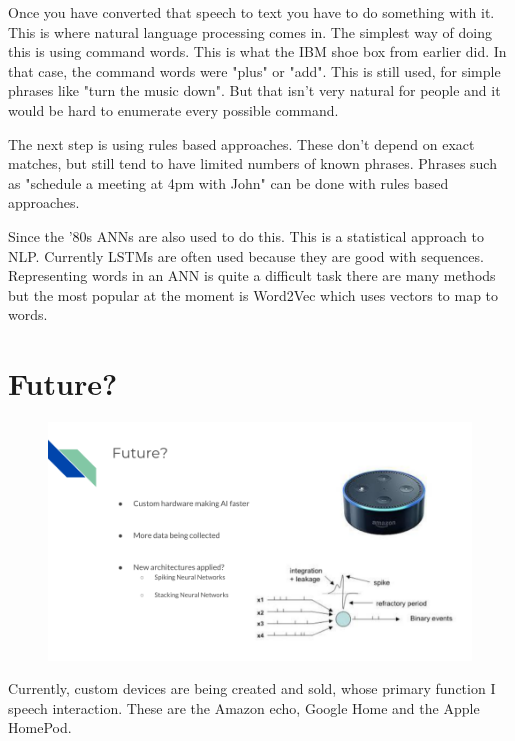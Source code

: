 \documentclass[10pt]{article}
\begin{document}
         Once you have converted that speech to text you have to do something with it. This is where natural language processing comes in.
        The simplest way of doing this is using command words. This is what the IBM shoe box from earlier did. In that case, the command words were "plus" or "add". 
        This is still used, for simple phrases like "turn the music down". But that isn't very natural for people and it would be hard to enumerate every possible command.
        
        The next step is using rules based approaches. These don't depend on exact matches, but still tend to have limited numbers of known phrases. Phrases such as "schedule a meeting at 4pm with John" can be done with rules based approaches. \cite{nlp}
        
        Since the '80s ANNs are also used to do this. This is a statistical approach to NLP. Currently LSTMs are often used because they are good with sequences. Representing words in an ANN is quite a difficult task there are many methods but the most popular at the moment is Word2Vec which uses vectors to map to words. \cite{mikolov2013efficient}
        
        \newpage

    \section*{Future?}
	    
	    \begin{figure}[H]
            \centering
            \includegraphics[width=1\textwidth]{slide_6}
            \label{fig:appendix:slide_6}
        \end{figure}

        Currently, custom devices are being created and sold, whose primary function I speech interaction. These are the Amazon echo, Google Home and the Apple HomePod.
        
\end{document}
